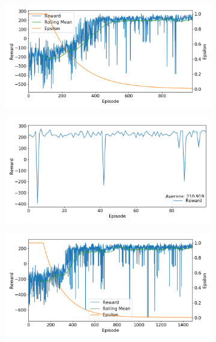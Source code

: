 \documentclass[10pt]{article}
\begin{document}
\begin{figure}[H]
  \centering
  \begin{subfigure}[b]{0.49\linewidth}
  \centering
  \includegraphics[width=\linewidth]{../logs/train_param_0059.png}
      \caption{}
  \label{fig:train_param_0059}
  \end{subfigure}
  \begin{subfigure}[b]{0.49\linewidth}
  \centering
  \includegraphics[width=\linewidth]{../logs/test_param_0059.png}
      \caption{}
  \label{fig:test_param_0059}
  \end{subfigure}
  \begin{subfigure}[b]{0.49\linewidth}
  \centering
  \includegraphics[width=\linewidth]{../logs/train_param_0060.png}

\end{subfigure}
\end{figure}
\end{document}
